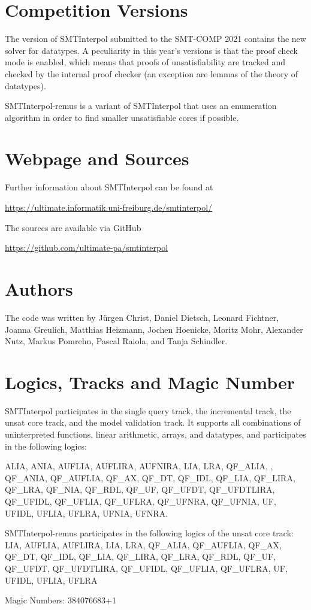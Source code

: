 \documentclass[a4paper]{easychair}
\newcommand\SI{SMTInterpol\xspace}
\newcommand\SIrem{SMTInterpol-remus\xspace}
\begin{document}
\section*{Competition Versions}
The version of \SI submitted to the SMT-COMP 2021 contains the new solver for datatypes.
A peculiarity in this year's versions is that the proof check mode is enabled, which means that proofs of unsatisfiability are tracked and checked by the internal proof checker (an exception are lemmas of the theory of datatypes).

\SIrem is a variant of \SI that uses an enumeration algorithm in order to find smaller unsatisfiable cores if possible.

\section*{Webpage and Sources}
Further information about \SI can be found at
\begin{center}
  \url{https://ultimate.informatik.uni-freiburg.de/smtinterpol/}
\end{center}
The sources are available via GitHub
\begin{center}
  \url{https://github.com/ultimate-pa/smtinterpol}
\end{center}

\section*{Authors}
The code was written by J{\"u}rgen Christ, Daniel Dietsch, Leonard Fichtner, Joanna Greulich, Matthias Heizmann, Jochen Hoenicke, Moritz Mohr, Alexander Nutz, Markus Pomrehn, Pascal Raiola, and Tanja Schindler.

\section*{Logics, Tracks and Magic Number}

\SI participates in the single query track, the incremental track, the unsat core track, and the model validation track.
It supports all combinations of uninterpreted functions, linear arithmetic, arrays, and datatypes, and participates in the following logics:

ALIA, ANIA, AUFLIA, AUFLIRA, AUFNIRA, LIA, LRA,
QF\_ALIA, , QF\_ANIA, QF\_AUFLIA, QF\_AX, QF\_DT, QF\_IDL, QF\_LIA, QF\_LIRA, QF\_LRA, QF\_NIA, QF\_RDL, QF\_UF, QF\_UFDT, QF\_UFDTLIRA, QF\_UFIDL, QF\_UFLIA, QF\_UFLRA, QF\_UFNRA, QF\_UFNIA,
UF, UFIDL, UFLIA, UFLRA, UFNIA, UFNRA.

\SIrem participates in the following logics of the unsat core track:
LIA, AUFLIA, AUFLIRA, LIA, LRA, QF\_ALIA, QF\_AUFLIA, QF\_AX, QF\_DT, QF\_IDL, QF\_LIA, QF\_LIRA, QF\_LRA, QF\_RDL, QF\_UF, QF\_UFDT, QF\_UFDTLIRA, QF\_UFIDL, QF\_UFLIA, QF\_UFLRA, UF, UFIDL, UFLIA, UFLRA

Magic Numbers: 384076683+1



\end{document}
